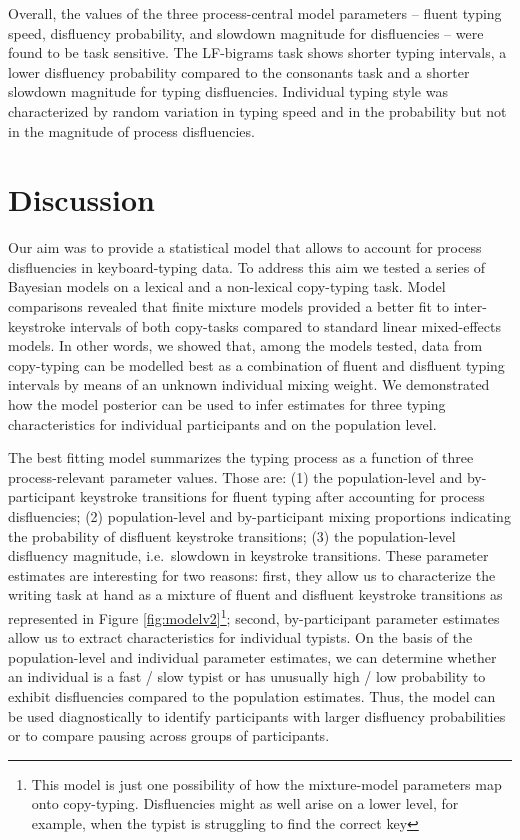 \documentclass[
  english,
  man,mask,floatsintext]{apa7}
\begin{document}
Overall, the values of the three process-central model parameters -- fluent typing speed, disfluency probability, and slowdown magnitude for disfluencies -- were found to be task sensitive. The LF-bigrams task shows shorter typing intervals, a lower disfluency probability compared to the consonants task and a shorter slowdown magnitude for typing disfluencies. Individual typing style was characterized by random variation in typing speed and in the probability but not in the magnitude of process disfluencies.

\hypertarget{discussion}{%
\section{Discussion}\label{discussion}}

Our aim was to provide a statistical model that allows to account for process disfluencies in keyboard-typing data. To address this aim we tested a series of Bayesian models on a lexical and a non-lexical copy-typing task. Model comparisons revealed that finite mixture models provided a better fit to inter-keystroke intervals of both copy-tasks compared to standard linear mixed-effects models. In other words, we showed that, among the models tested, data from copy-typing can be modelled best as a combination of fluent and disfluent typing intervals by means of an unknown individual mixing weight. We demonstrated how the model posterior can be used to infer estimates for three typing characteristics for individual participants and on the population level.

The best fitting model summarizes the typing process as a function of three process-relevant parameter values. Those are: (1) the population-level and by-participant keystroke transitions for fluent typing after accounting for process disfluencies; (2) population-level and by-participant mixing proportions indicating the probability of disfluent keystroke transitions; (3) the population-level disfluency magnitude, i.e.~slowdown in keystroke transitions. These parameter estimates are interesting for two reasons: first, they allow us to characterize the writing task at hand as a mixture of fluent and disfluent keystroke transitions as represented in Figure \ref{fig:modelv2}\footnote{This model is just one possibility of how the mixture-model parameters map onto copy-typing. Disfluencies might as well arise on a lower level, for example, when the typist is struggling to find the correct key}; second, by-participant parameter estimates allow us to extract characteristics for individual typists. On the basis of the population-level and individual parameter estimates, we can determine whether an individual is a fast / slow typist or has unusually high / low probability to exhibit disfluencies compared to the population estimates. Thus, the model can be used diagnostically to identify participants with larger disfluency probabilities or to compare pausing across groups of participants.
\end{document}
